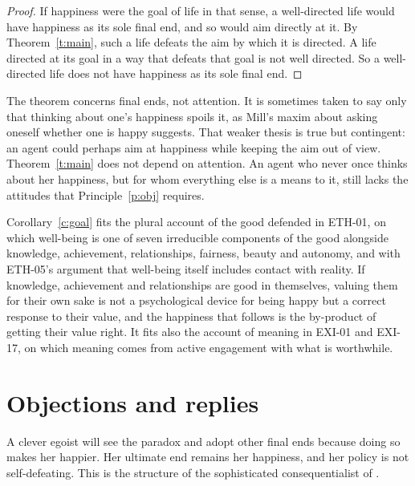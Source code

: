 \documentclass{situationist-preprint}
\begin{document}
\begin{proof}
If happiness were the goal of life in that sense, a well-directed life would have happiness as its sole final end, and so would aim directly at it. By Theorem~\ref{t:main}, such a life defeats the aim by which it is directed. A life directed at its goal in a way that defeats that goal is not well directed. So a well-directed life does not have happiness as its sole final end.
\end{proof}

The theorem concerns final ends, not attention. It is sometimes taken to say only that thinking about one's happiness spoils it, as Mill's maxim about asking oneself whether one is happy suggests. That weaker thesis is true but contingent: an agent could perhaps aim at happiness while keeping the aim out of view. Theorem~\ref{t:main} does not depend on attention. An agent who never once thinks about her happiness, but for whom everything else is a means to it, still lacks the attitudes that Principle~\ref{p:obj} requires.

Corollary~\ref{c:goal} fits the plural account of the good defended in ETH-01, on which well-being is one of seven irreducible components of the good alongside knowledge, achievement, relationships, fairness, beauty and autonomy, and with ETH-05's argument that well-being itself includes contact with reality. If knowledge, achievement and relationships are good in themselves, valuing them for their own sake is not a psychological device for being happy but a correct response to their value, and the happiness that follows is the by-product of getting their value right. It fits also the account of meaning in EXI-01 and EXI-17, on which meaning comes from active engagement with what is worthwhile.

\section{Objections and replies}

\begin{objection}\label{o:soph}
A clever egoist will see the paradox and adopt other final ends because doing so makes her happier. Her ultimate end remains her happiness, and her policy is not self-defeating. This is the structure of the sophisticated consequentialist of \citet{Railton1984}.
\end{objection}
\end{document}
